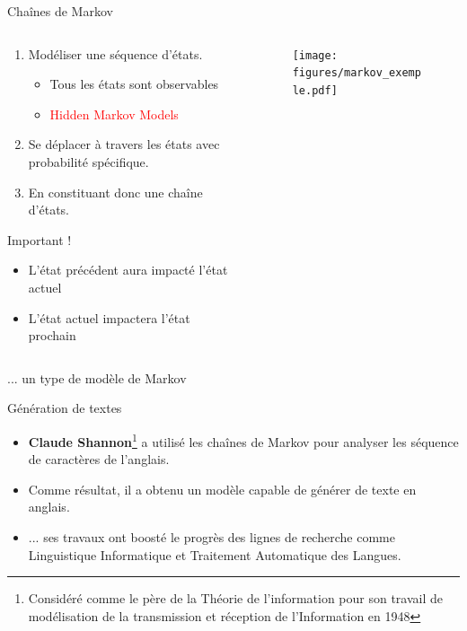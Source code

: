 \documentclass[aspectratio=169,xcolor=dvipsnames, t]{beamer}
\begin{document}
\begin{frame}{Chaînes de Markov}
	
	\begin{columns}
		\begin{column}{0.70\textwidth}
			\begin{enumerate}
				\item Modéliser une séquence d'états.
				\begin{itemize}
					\item Tous les états sont observables
					\item \textcolor{red}{Hidden Markov Models}
				\end{itemize}
				\item Se déplacer à travers les états avec probabilité spécifique.
				\item En constituant donc une chaîne d'états.
			\end{enumerate}
		
			\begin{alertblock}{Important !}
				\begin{itemize}
					\item L'état précédent aura impacté l'état actuel
					\item L'état actuel impactera l'état prochain
				\end{itemize}
			\end{alertblock}			

		\end{column}
		\begin{column}{0.28\textwidth}
			\begin{figure}
				\texttt{[image: figures/markov\_exemple.pdf]}
			\end{figure}
		\end{column}
	\end{columns}
	

\end{frame}


\begin{frame}{... un type de modèle de Markov}
	
	
	
	\begin{block}{Génération de textes}
		\begin{itemize}
			\item \textbf{Claude Shannon}\footnote{Considéré comme le père de la Théorie de l'information pour son travail de modélisation de la transmission et réception de l'Information en 1948} a utilisé les chaînes de Markov pour analyser les séquence de caractères de l'anglais.
			\item Comme résultat, il a obtenu un modèle capable de générer de texte en anglais.
			\item ... ses travaux ont boosté le progrès des lignes de recherche comme Linguistique Informatique et Traitement Automatique des Langues.
		\end{itemize}
		
	\end{block}
	
\end{frame}
\end{document}

